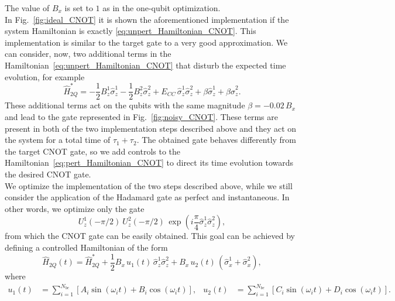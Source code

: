 \documentclass[../main/main.tex]{subfiles}
\begin{document}
\vspace{0.5cm}
The value of $B_x$ is set to $1$ as in the one-qubit optimization.\\
In Fig.~\ref{fig:ideal_CNOT} it is shown the aforementioned implementation if the system Hamiltonian is exactly \eqref{eq:unpert_Hamiltonian_CNOT}. This implementation is similar to the target gate to a very good approximation. We can consider, now, two additional terms in the Hamiltonian~\eqref{eq:unpert_Hamiltonian_CNOT} that disturb the expected time evolution, for example
\begin{equation} \label{eq:pert_Hamiltonian_CNOT}
    \hat{H}^*_{2Q} = -\frac{1}{2} B_z^1 \hat{\sigma}_z^1 -\frac{1}{2} B_z^2 \hat{\sigma}_z^2 + E_{CC}\, \hat{\sigma}_z^1 \hat{\sigma}_z^2 + \beta \hat{\sigma}_z^1 + \beta \hat{\sigma}_z^2 .
\end{equation}
These additional terms act on the qubits with the same magnitude $\beta=-0.02\, B_x$ and lead to the gate represented in Fig.~\ref{fig:noisy_CNOT}. These terms are present in both of the two implementation steps described above and they act on the system for a total time of $\tau_1+\tau_2$. The obtained gate behaves differently from the target CNOT gate, so we add controls to the Hamiltonian~\eqref{eq:pert_Hamiltonian_CNOT} to direct its time evolution towards the desired CNOT gate.\\
We optimize the implementation of the two steps described above, while we still consider the application of the Hadamard gate as perfect and instantaneous. In other words, we optimize only the gate
\begin{equation} \label{eq:simple_CNOT_gate}
    U_z^1(-\pi/2)\ U_z^2(-\pi/2)\, \exp{\left(i\frac{\pi}{4} \hat{\sigma}_z^1 \hat{\sigma}_z^2 \right)},
\end{equation}
from which the CNOT gate can be easily obtained. This goal can be achieved by defining a controlled Hamiltonian of the form
\begin{equation} \label{eq:ctrl_Hamiltonian_CNOT}
    \hat{H}_{2Q}(t) = \hat{H}^*_{2Q} + \frac{1}{2} B_x\,  u_1(t)\, \hat{\sigma}_z^1 \hat{\sigma}_z^2 + B_x\, u_2(t)\, \left( \hat{\sigma}_x^1 + \hat{\sigma}_x^2 \right),
\end{equation}
where
\begin{align} \label{eq:pulses_definition_CNOT}
    u_1(t) &= \sum_{i=1}^{N_{be}} \left[ A_i \sin(\omega_i t) + B_i \cos(\omega_i t) \right],
    &
    u_2(t) &= \sum_{i=1}^{N_{be}} \left[ C_i \sin(\omega_i t) + D_i \cos(\omega_i t) \right].
\end{align}
\end{document}
